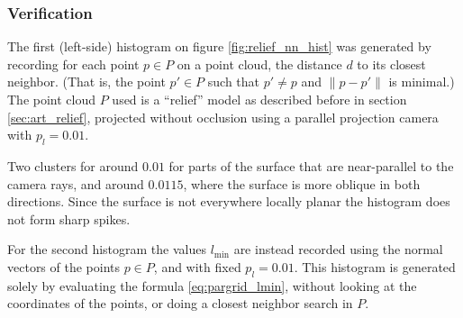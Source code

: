 \subsubsection{Verification}
The first (left-side) histogram on figure \ref{fig:relief_nn_hist} was generated by recording for each point $p \in P$ on a point cloud, the distance $d$ to its closest neighbor. (That is, the point $p' \in P$ such that $p' \neq p$ and $\| p - p' \|$ is minimal.) The point cloud $P$ used is a ``relief'' model as described before in section \ref{sec:art_relief}, projected without occlusion using a parallel projection camera with $p_l = 0.01$.

Two clusters for around $0.01$ for parts of the surface that are near-parallel to the camera rays, and around $0.0115$, where the surface is more oblique in both directions. Since the surface is not everywhere locally planar the histogram does not form sharp spikes.

For the second histogram the values $l_{\text{min}}$ are instead recorded using the normal vectors of the points $p \in P$, and with fixed $p_l = 0.01$. This histogram is generated solely by evaluating the formula \ref{eq:pargrid_lmin}, without looking at the coordinates of the points, or doing a closest neighbor search in $P$.


